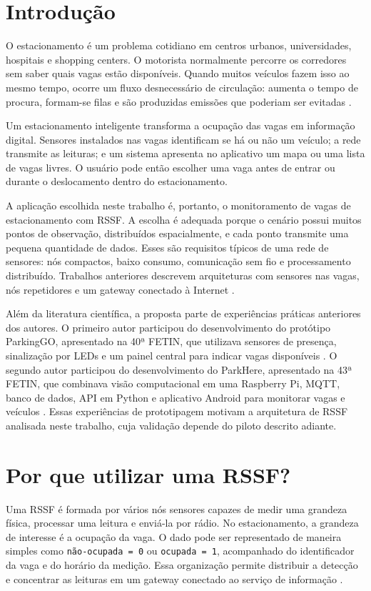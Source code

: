 \documentclass[11pt,a4paper]{article}
\begin{document}
\section{Introdução}
O estacionamento é um problema cotidiano em centros urbanos, universidades, hospitais e shopping centers. O motorista normalmente percorre os corredores sem saber quais vagas estão disponíveis. Quando muitos veículos fazem isso ao mesmo tempo, ocorre um fluxo desnecessário de circulação: aumenta o tempo de procura, formam-se filas e são produzidas emissões que poderiam ser evitadas \cite{hilmani2018}.

Um estacionamento inteligente transforma a ocupação das vagas em informação digital. Sensores instalados nas vagas identificam se há ou não um veículo; a rede transmite as leituras; e um sistema apresenta no aplicativo um mapa ou uma lista de vagas livres. O usuário pode então escolher uma vaga antes de entrar ou durante o deslocamento dentro do estacionamento.

A aplicação escolhida neste trabalho é, portanto, o monitoramento de vagas de estacionamento com RSSF. A escolha é adequada porque o cenário possui muitos pontos de observação, distribuídos espacialmente, e cada ponto transmite uma pequena quantidade de dados. Esses são requisitos típicos de uma rede de sensores: nós compactos, baixo consumo, comunicação sem fio e processamento distribuído. Trabalhos anteriores descrevem arquiteturas com sensores nas vagas, nós repetidores e um gateway conectado à Internet \cite{bagula2015,chen2016}.

Além da literatura científica, a proposta parte de experiências práticas anteriores dos autores. O primeiro autor participou do desenvolvimento do protótipo ParkingGO, apresentado na 40ª FETIN, que utilizava sensores de presença, sinalização por LEDs e um painel central para indicar vagas disponíveis \cite{ribeiro2021parkinggo}. O segundo autor participou do desenvolvimento do ParkHere, apresentado na 43ª FETIN, que combinava visão computacional em uma Raspberry Pi, MQTT, banco de dados, API em Python e aplicativo Android para monitorar vagas e veículos \cite{silva2024parkhere}. Essas experiências de prototipagem motivam a arquitetura de RSSF analisada neste trabalho, cuja validação depende do piloto descrito adiante.

\section{Por que utilizar uma RSSF?}
Uma RSSF é formada por vários nós sensores capazes de medir uma grandeza física, processar uma leitura e enviá-la por rádio. No estacionamento, a grandeza de interesse é a ocupação da vaga. O dado pode ser representado de maneira simples como \texttt{não-ocupada = 0} ou \texttt{ocupada = 1}, acompanhado do identificador da vaga e do horário da medição. Essa organização permite distribuir a detecção e concentrar as leituras em um gateway conectado ao serviço de informação \cite{bagula2015,hilmani2018}.
\end{document}

